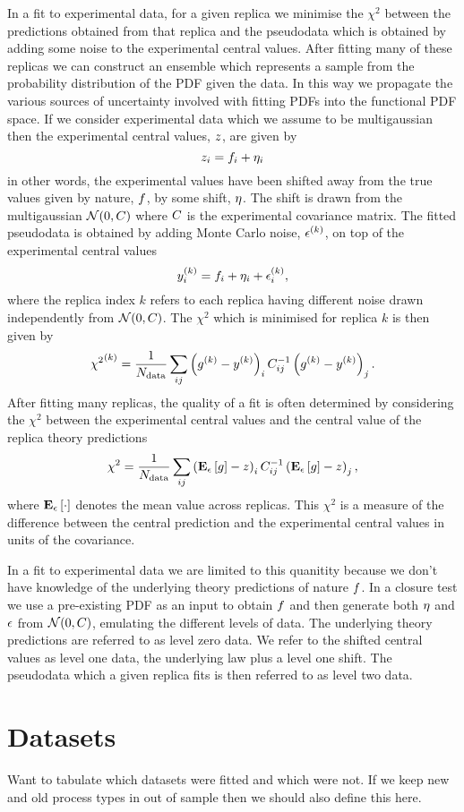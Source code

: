 In a fit to experimental data, for a given replica we minimise the $\chi^2$
between the predictions obtained from that replica and the pseudodata which is
obtained by adding some noise to the experimental central values. After fitting
many of these replicas we can construct an ensemble which represents a sample
from the probability distribution of the PDF given the data. In this
way we propagate the various sources of uncertainty involved with fitting PDFs
into the functional PDF space. If we consider experimental data which we assume
to be multigaussian then the experimental central values, $z$, are given by
\begin{equation}
    z_{i} = f_i + \eta_i
\end{equation}
in other words, the experimental values have been shifted away from the true
values given by nature, $f$, by some shift, $\eta$. The shift is drawn from
the multigaussian $\mathcal{N}(0, C)$ where $C$ is the experimental covariance
matrix. The fitted pseudodata is obtained by adding Monte Carlo noise, $\epsilon^{(k)}$,
on top of the experimental central values
\begin{equation}
    y^{(k)}_{i} = f_i + \eta_i + \epsilon^{(k)}_{i},
\end{equation}
where the replica index $k$ refers to each replica having different noise drawn
independently from $\mathcal{N}(0, C)$. The $\chi^2$ which is minimised for
replica $k$ is then given by
\begin{equation}
    {\chi^2}^{(k)} = \frac{1}{N_{\rm data}} \sum_{ij} \left( g^{(k)} - y^{(k)} \right)_i C^{-1}_{ij} \left( g^{(k)} - y^{(k)} \right)_j.
\end{equation}
After fitting many replicas, the quality of a fit is often determined by
considering the $\chi^2$ between the experimental central values and the
central value of the replica theory predictions
\begin{equation}
    \chi^2 = \frac{1}{N_{\rm data}} \sum_{ij} \left( \mathbf{E}_{\epsilon}\left[ g \right] - z \right)_i C^{-1}_{ij} \left( \mathbf{E}_{\epsilon}\left[ g \right] - z \right)_j,
\end{equation}
where $\mathbf{E}_{\epsilon}\left[ \cdot \right]$ denotes the mean value across replicas. This $\chi^2$ is a
measure of the difference between the central prediction and the experimental
central values in units of the covariance.

In a fit to
experimental data we are limited to this quanitity because we don't have knowledge
of the underlying theory predictions of nature $f$. In a closure test we use
a pre-existing PDF as an input to obtain $f$ and then generate both
$\eta$ and $\epsilon$ from $\mathcal{N}(0, C)$, emulating the different levels
of data. The underlying theory predictions are referred to as level zero data.
We refer to the shifted central values as level one data, the underlying
law plus a level one shift. The pseudodata which a given replica fits is then
referred to as level two data.

\section{Datasets}

Want to tabulate which datasets were fitted and which were not. If we keep new
and old process types in out of sample then we should also define this here.